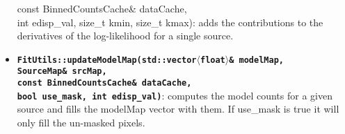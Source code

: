 \documentclass[preprint]{aastex}
\begin{document}
\begin{itemize}
{{{        const BinnedCountsCache\& dataCache,  \\ \hspace{1in}
        int edisp\_val, size\_t kmin, size\_t kmax)}}:
    adds the contributions to the derivatives of the log-likelihood for a single source.}  
\item{ {\bf {\tt FitUtils::updateModelMap(std::vector$\langle$float$\rangle$\& modelMap, \\ \hspace{1in}
        SourceMap\& srcMap, \\ \hspace{1in}
        const BinnedCountsCache\& dataCache, \\ \hspace{1in}
        bool use\_mask, int edisp\_val)}}: computes the model counts
    for a given source and fills the modelMap vector with them.  If use\_mask is true it will only fill the un-masked pixels.}
\end{itemize}
\end{document}
